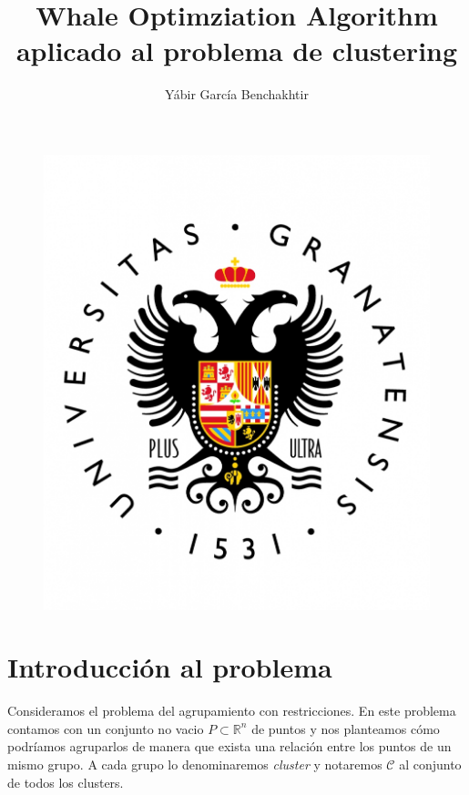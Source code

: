 \documentclass[11pt]{article}
\title{Whale Optimziation Algorithm aplicado al problema de clustering}
\author{Yábir García Benchakhtir}
\begin{document}
\maketitle

\begin{figure}[h]
\includegraphics[scale=0.3]{UGR}
\centering
\end{figure}

\newpage

\renewcommand*\contentsname{Índice}
\tableofcontents

\newpage

\section{Introducción al problema}


Consideramos el problema del agrupamiento con restricciones. En este
problema contamos con un conjunto no vacio $P \subset \mathbb{R}^n$ de
puntos y nos planteamos cómo podríamos agruparlos de manera que exista
una relación entre los puntos de un mismo grupo. A cada grupo lo
denominaremos \textit{cluster} y notaremos $\mathcal{C}$ al conjunto
de todos los clusters.
\end{document}
